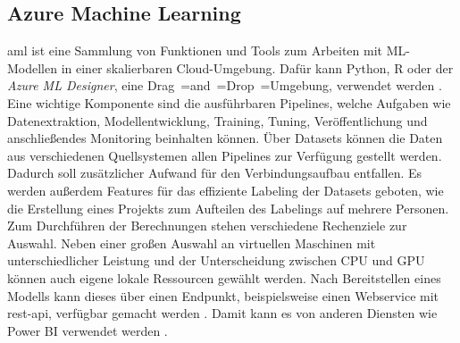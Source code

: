 




\subsection{Azure Machine Learning} \label{sec:grundlagen:azure_dienste:machineLearning}
\ac{aml} ist eine Sammlung von Funktionen und Tools zum Arbeiten mit ML-Modellen in einer skalierbaren Cloud-Umgebung. Dafür kann Python, R oder der \textit{Azure ML Designer}, eine Drag~=and~=Drop~=Umgebung, verwendet werden \cite{soh_data_2020}. Eine wichtige Komponente sind die ausführbaren Pipelines, welche Aufgaben wie Datenextraktion, Modellentwicklung, Training, Tuning, Veröffentlichung und anschließendes Monitoring beinhalten können. Über Datasets können die Daten aus verschiedenen Quellsystemen allen Pipelines zur Verfügung gestellt werden. Dadurch soll zusätzlicher Aufwand für den Verbindungsaufbau entfallen. Es werden außerdem Features für das effiziente Labeling der Datasets geboten, wie die Erstellung eines Projekts zum Aufteilen des Labelings auf mehrere Personen. Zum Durchführen der Berechnungen stehen verschiedene Rechenziele zur Auswahl. Neben einer großen Auswahl an virtuellen Maschinen mit unterschiedlicher Leistung und der Unterscheidung zwischen CPU und GPU können auch eigene lokale Ressourcen gewählt werden. Nach Bereitstellen eines Modells kann dieses über einen Endpunkt, beispielsweise einen Webservice mit \ac{rest}-\ac{api}, verfügbar gemacht werden \cite{price_azure_2021}. Damit kann es von anderen Diensten wie Power BI verwendet werden \cite{msdoc_21_aml_consumeModel}.

